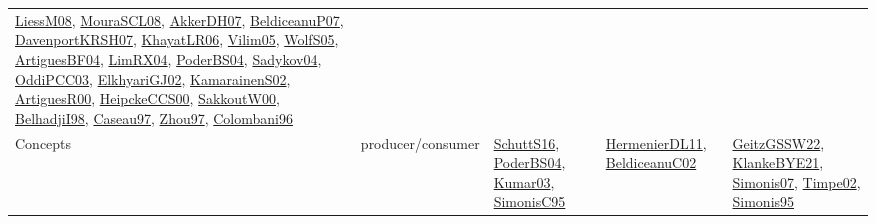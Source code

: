 {\begin{longtable}{lp{3cm}>{\raggedright}p{6cm}>{\raggedright}p{6cm}p{8cm}}
\href{articles/LiessM08.pdf}{LiessM08}\cite{LiessM08}, \href{papers/MouraSCL08.pdf}{MouraSCL08}\cite{MouraSCL08}, \href{papers/AkkerDH07.pdf}{AkkerDH07}\cite{AkkerDH07}, \href{papers/BeldiceanuP07.pdf}{BeldiceanuP07}\cite{BeldiceanuP07}, \href{papers/DavenportKRSH07.pdf}{DavenportKRSH07}\cite{DavenportKRSH07}, \href{articles/KhayatLR06.pdf}{KhayatLR06}\cite{KhayatLR06}, \href{papers/Vilim05.pdf}{Vilim05}\cite{Vilim05}, \href{papers/WolfS05.pdf}{WolfS05}\cite{WolfS05}, \href{papers/ArtiguesBF04.pdf}{ArtiguesBF04}\cite{ArtiguesBF04}, \href{papers/LimRX04.pdf}{LimRX04}\cite{LimRX04}, \href{articles/PoderBS04.pdf}{PoderBS04}\cite{PoderBS04}, \href{papers/Sadykov04.pdf}{Sadykov04}\cite{Sadykov04}, \href{papers/OddiPCC03.pdf}{OddiPCC03}\cite{OddiPCC03}, \href{papers/ElkhyariGJ02.pdf}{ElkhyariGJ02}\cite{ElkhyariGJ02}, \href{papers/KamarainenS02.pdf}{KamarainenS02}\cite{KamarainenS02}, \href{articles/ArtiguesR00.pdf}{ArtiguesR00}\cite{ArtiguesR00}, \href{articles/HeipckeCCS00.pdf}{HeipckeCCS00}\cite{HeipckeCCS00}, \href{articles/SakkoutW00.pdf}{SakkoutW00}\cite{SakkoutW00}, \href{articles/BelhadjiI98.pdf}{BelhadjiI98}\cite{BelhadjiI98}, \href{papers/Caseau97.pdf}{Caseau97}\cite{Caseau97}, \href{articles/Zhou97.pdf}{Zhou97}\cite{Zhou97}, \href{papers/Colombani96.pdf}{Colombani96}\cite{Colombani96}\\
Concepts & producer/consumer & \href{papers/SchuttS16.pdf}{SchuttS16}\cite{SchuttS16}, \href{articles/PoderBS04.pdf}{PoderBS04}\cite{PoderBS04}, \href{papers/Kumar03.pdf}{Kumar03}\cite{Kumar03}, \href{papers/SimonisC95.pdf}{SimonisC95}\cite{SimonisC95} & \href{papers/HermenierDL11.pdf}{HermenierDL11}\cite{HermenierDL11}, \href{papers/BeldiceanuC02.pdf}{BeldiceanuC02}\cite{BeldiceanuC02} & \href{papers/GeitzGSSW22.pdf}{GeitzGSSW22}\cite{GeitzGSSW22}, \href{papers/KlankeBYE21.pdf}{KlankeBYE21}\cite{KlankeBYE21}, \href{articles/Simonis07.pdf}{Simonis07}\cite{Simonis07}, \href{articles/Timpe02.pdf}{Timpe02}\cite{Timpe02}, \href{papers/Simonis95.pdf}{Simonis95}\cite{Simonis95}\\

\end{longtable}}
